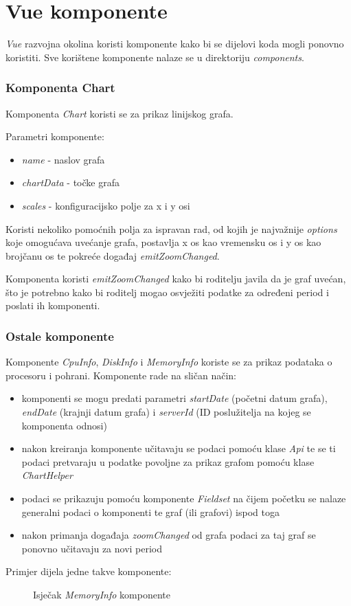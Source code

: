 \documentclass[zavrsnirad]{fer}
\begin{document}
\section{Vue komponente}
\textit{Vue} razvojna okolina koristi komponente kako bi se dijelovi koda mogli ponovno koristiti. Sve korištene komponente nalaze se u direktoriju \textit{components}.

\subsubsection{Komponenta Chart}
Komponenta \textit{Chart} koristi se za prikaz linijskog grafa.

Parametri komponente:
\begin{itemize}
	\item \textit{name} - naslov grafa
	\item \textit{chartData} - točke grafa
	\item \textit{scales} - konfiguracijsko polje za x i y osi
\end{itemize}
Koristi nekoliko pomoćnih polja za ispravan rad, od kojih je najvažnije  \textit{options} koje omogućava uvećanje grafa, postavlja x os kao vremensku os i y os kao brojčanu os  te pokreće događaj \textit{emitZoomChanged}.

Komponenta koristi \textit{emitZoomChanged}  kako bi roditelju javila da je graf uvećan, što je potrebno kako bi roditelj mogao osvježiti podatke za određeni period i poslati ih komponenti.


\subsubsection{Ostale komponente}
Komponente \textit{CpuInfo}, \textit{DiskInfo} i \textit{MemoryInfo} koriste se za prikaz podataka o procesoru i pohrani. Komponente rade na sličan način:
\begin{itemize}
	\item komponenti se mogu predati parametri \textit{startDate} (početni datum grafa), \textit{endDate} (krajnji datum grafa) i \textit{serverId} (ID poslužitelja na kojeg se komponenta odnosi)
	\item nakon kreiranja komponente učitavaju se podaci pomoću klase \textit{Api} te se ti podaci pretvaraju u podatke povoljne za prikaz grafom pomoću klase \textit{ChartHelper}
	\item podaci se prikazuju pomoću komponente \textit{Fieldset} na čijem početku se nalaze generalni podaci o komponenti te graf (ili grafovi) ispod toga
	\item nakon primanja događaja \textit{zoomChanged} od grafa podaci za taj graf se ponovno učitavaju za novi period
\end{itemize}
Primjer dijela jedne takve komponente:
\begin{figure}[htb]
	\centering
	
	\caption{Isječak \textit{MemoryInfo} komponente}
\end{figure}
\FloatBarrier
\end{document}
